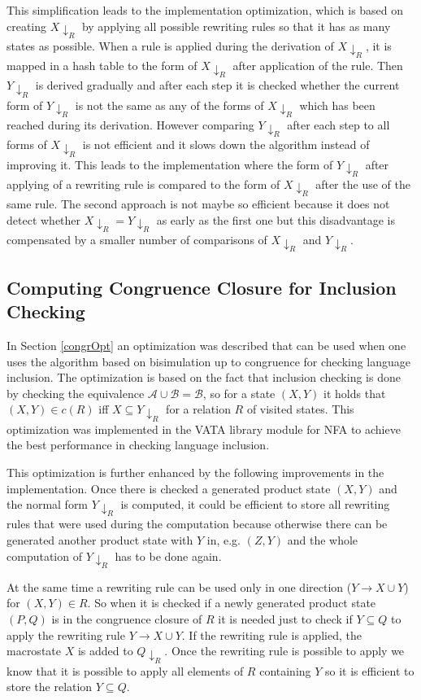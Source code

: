 This simplification leads to the implementation optimization, which is based on creating $X{\downarrow_R}$ by applying all possible rewriting rules
so that it has as many states as possible. 
When a rule is applied during the derivation of $X{\downarrow_R}$, it is mapped in a hash table to 
the form of $X{\downarrow_R}$ after application of the rule.
Then $Y{\downarrow_R}$ is derived gradually and after each step it is checked whether the current form of $Y{\downarrow_R}$ is not the same as any of the forms of
$X{\downarrow_R}$ which has been reached during its derivation. However 
comparing $Y{\downarrow_R}$ after each step to all forms of $X{\downarrow_R}$ is not efficient
and it slows down the algorithm instead of improving it. This leads to the implementation where the form of $Y{\downarrow_R}$ after applying of a rewriting rule 
is compared to the form of $X{\downarrow_R}$ after the use of the same rule. 
The second approach is not maybe so efficient because it does not detect whether 
$X{\downarrow_R}=Y{\downarrow_R}$ as early as the first one but this disadvantage is compensated by a smaller number of comparisons 
of $X{\downarrow_R}$ and $Y{\downarrow_R}$.

\subsection{Computing Congruence Closure for Inclusion Checking}
In Section \ref{congrOpt} an optimization was described that can be used when one uses the algorithm based on bisimulation up to congruence for checking 
language inclusion. The optimization is based on the fact that inclusion checking is done by checking the equivalence $\mathcal{A}\cup\mathcal{B}=\mathcal{B}$,
so for a state $(X,Y)$ it holds that $(X,Y)\in c(R)$ iff $X\subseteq Y{\downarrow_R}$ for a relation $R$ of visited states. 
This optimization was implemented in the VATA library module for NFA to achieve the best performance in checking language inclusion.

This optimization is further enhanced by the following improvements in the implementation. 
Once there is checked a generated product state $(X,Y)$ and the normal form 
$Y{\downarrow_R}$ is computed, it could be efficient to store all rewriting rules that were used during the computation because otherwise there can be
generated another product state with $Y$ in, e.g. $(Z,Y)$ and the whole computation of $Y{\downarrow_R}$ has to be done again. 

At the same time a rewriting rule can be used only in one direction ($Y\rightarrow X\cup Y$) for $(X,Y)\in R$. So when it is checked
if a newly generated product state $(P,Q)$ is in the congruence closure of $R$ it is needed just to check if $Y \subseteq Q$ to apply 
the rewriting rule $Y\rightarrow X\cup Y$. If the rewriting rule is applied, the macrostate $X$ is added to $Q{\downarrow_R}$. 
Once the rewriting rule is possible to apply we know that it is possible to apply all elements of $R$ containing $Y$ 
so it is efficient to store the relation $Y\subseteq Q$.

